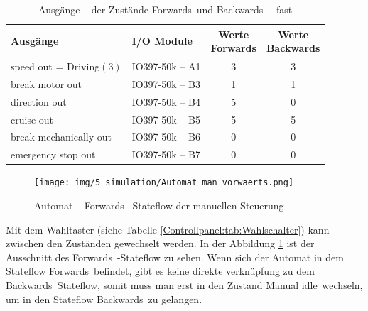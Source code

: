 \pagebreak[1]
\begin{table}[!ht]
	\centering
	\caption{Ausgänge – der Zustände \frqq Forwards\flqq\ und \frqq Backwards\flqq\ –  \frqq fast\flqq}
	\label{Automat_man:tab:z_V_schnell}
	\begin{tabular}{llcc}
		\hline
		\textbf{Ausgänge}                             & \textbf{I/O Module}                 & \makecell{\textbf{Werte}     \\ \textbf{\frqq Forwards\flqq}} & \makecell{\textbf{Werte}     \\ \textbf{\frqq Backwards\flqq}} \\ \hline
		\multicolumn{1}{l|}{speed out = Driving$(3)$} & \multicolumn{1}{l|}{IO397-50k – A1} & 3                        & 3 \\
		\multicolumn{1}{l|}{break motor out}          & \multicolumn{1}{l|}{IO397-50k – B3} & 1                        & 1 \\
		\multicolumn{1}{l|}{direction out}            & \multicolumn{1}{l|}{IO397-50k – B4} & 5                        & 0 \\
		\multicolumn{1}{l|}{cruise out}               & \multicolumn{1}{l|}{IO397-50k – B5} & 5                        & 5 \\
		\multicolumn{1}{l|}{break mechanically out}   & \multicolumn{1}{l|}{IO397-50k – B6} & 0                        & 0 \\
		\multicolumn{1}{l|}{emergency stop out}       & \multicolumn{1}{l|}{IO397-50k – B7} & 0                        & 0 \\ \hline
	\end{tabular}
\end{table}
\pagebreak[1]

\pagebreak[1]
\begin{figure}[!ht]
	\begin{center}
		\texttt{[image: img/5\_simulation/Automat\_man\_vorwaerts.png]}
		\caption{Automat – \frqq Forwards\flqq\ -Stateflow der manuellen Steuerung}
		\label{Automat_man:img:man_vorwärts}
	\end{center}
\end{figure}
\pagebreak[1]



Mit dem Wahltaster (siehe Tabelle \ref{Controllpanel:tab:Wahlschalter}) kann zwischen den Zuständen gewechselt werden. In der Abbildung \ref{Automat_man:img:man_vorwärts} ist der Ausschnitt des \frqq Forwards\flqq\ -Stateflow zu sehen. Wenn sich der Automat in dem Stateflow \frqq Forwards\flqq\ befindet, gibt es keine direkte verknüpfung zu dem \frqq Backwards\flqq\ Stateflow, somit muss man erst in den Zustand \frqq Manual idle\flqq\ wechseln, um in den Stateflow \frqq Backwards\flqq\ zu gelangen.

